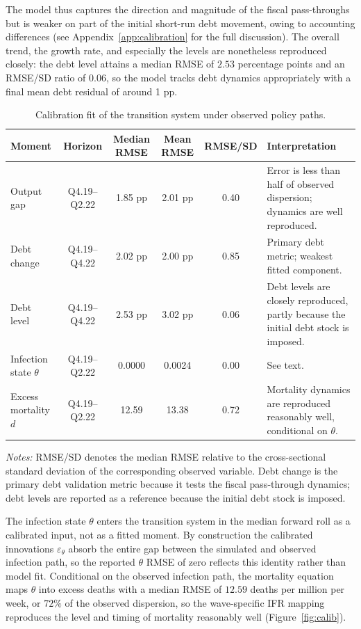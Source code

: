 \documentclass[12pt, a4paper]{article}
\begin{document}
\noindent The model thus captures the direction and magnitude of the fiscal pass-throughs but is weaker on part of the initial short-run debt movement, owing to accounting differences (see Appendix~\ref{app:calibration} for the full discussion). The overall trend, the growth rate, and especially the levels are nonetheless reproduced closely: the debt level attains a median RMSE of $2.53$ percentage points and an RMSE/SD ratio of $0.06$, so the model tracks debt dynamics appropriately with a final mean debt residual of around 1 pp. 



\begin{table}[H]
\centering
\caption{Calibration fit of the transition system under observed policy paths.}
\label{tab:calibration_fit}
\scriptsize
\begin{tabular}{lccccp{3.8cm}}
\toprule
\textbf{Moment} & \textbf{Horizon} & \textbf{Median RMSE} & \textbf{Mean RMSE} & \textbf{RMSE/SD} & \textbf{Interpretation} \\
\midrule
Output gap & Q4.19--Q2.22 & 1.85 pp & 2.01 pp & 0.40 & Error is less than half of observed dispersion; dynamics are well reproduced. \\
Debt change & Q4.19--Q4.22 & 2.02 pp & 2.00 pp & 0.85 & Primary debt metric; weakest fitted component. \\
Debt level & Q4.19--Q4.22 & 2.53 pp & 3.02 pp & 0.06 & Debt levels are closely reproduced, partly because the initial debt stock is imposed. \\
Infection state $\theta$ & Q4.19--Q2.22 & 0.0000 & 0.0024 & 0.00 & See text. \\
Excess mortality $d$ & Q4.19--Q2.22 & 12.59 & 13.38 & 0.72 & Mortality dynamics are reproduced reasonably well, conditional on $\theta$. \\
\bottomrule
\end{tabular}
\vspace{0.15cm}
\begin{minipage}{0.95\textwidth}
\scriptsize
\textit{Notes:} RMSE/SD denotes the median RMSE relative to the cross-sectional standard deviation of the corresponding observed variable. Debt change is the primary debt validation metric because it tests the fiscal pass-through dynamics; debt levels are reported as a reference because the initial debt stock is imposed. 
\end{minipage}
\end{table}

\noindent The infection state $\theta$ enters the transition system in the median forward roll as a calibrated input, not as a fitted moment. By construction the calibrated innovations $\varepsilon_{\theta}$ absorb the entire gap between the simulated and observed infection path, so the reported $\theta$ RMSE of zero reflects this identity rather than model fit. Conditional on the observed infection path, the mortality equation maps $\theta$ into excess deaths with a median RMSE of $12.59$ deaths per million per week, or $72\%$ of the observed dispersion, so the wave-specific IFR mapping reproduces the level and timing of mortality reasonably well (Figure~\ref{fig:calib}).
\end{document}
